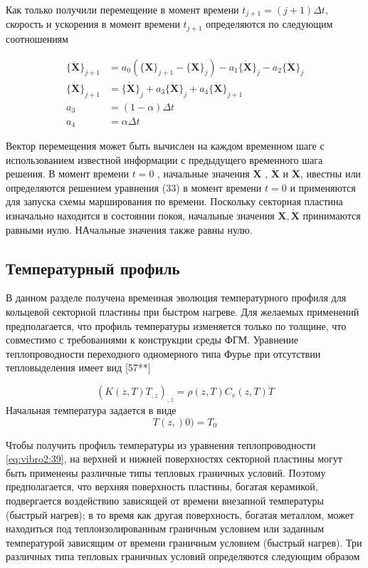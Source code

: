 Как только получили перемещение в момент времени \(t_{j+1} = (j+1)\Delta t\), скорость и ускорения в момент времени \(t_{j+1}\) определяются по следующим соотношениям

\begin{equation}
	\label{eq:vibro2:37}
	\begin{split}
	\{\boldsymbol{\ddot{X}} \}_{j+1} &= a_0 (\{\boldsymbol{X} \}_{j+1}-\{\boldsymbol{X} \}_{j}) - a_1 \{\boldsymbol{\dot{X}} \}_{j} - a_2 \{\boldsymbol{\ddot{X}} \}_{j}
	\\
	\{\boldsymbol{\ddot{X}} \}_{j+1} &= \{\boldsymbol{\dot{X}} \}_{j}+a_3\{\boldsymbol{\ddot{X}} \}_{j}+a_4 \{\boldsymbol{\ddot{X}} \}_{j+1}
	\\
	a_3 & = (1-\alpha)\Delta t
	\\
	a_4 &= \alpha \Delta t
	\end{split}
\end{equation}

Вектор перемещения может быть вычислен на каждом временном шаге с использованием известной информации с предыдущего временного шага решения. В момент времени \(t =0\) , начальные значения \(\boldsymbol{X}\) , \(\boldsymbol{\dot{X}}\) и \(\boldsymbol{\ddot{X}}\), ивестны или определяются решением уравнения (33) в момент времени \(t =0\) и применяются для запуска схемы марширования по времени. Поскольку секторная пластина изначально находится в состоянии покоя, начальные значения \(\boldsymbol{X}, \boldsymbol{\dot{X}}\) принимаются равными нулю. НАчальные значения также равны нулю.

\subsection{Температурный профиль}\label{ch:ch3/sec3/sub6}

В данном разделе получена временная эволюция температурного профиля для кольцевой секторной пластины при быстром нагреве.  Для желаемых применений предполагается, что профиль температуры изменяется только по толщине, что совместимо с требованиями к конструкции среды ФГМ. Уравнение теплопроводности переходного одномерного типа Фурье при отсутствии тепловыделения имеет вид [57**]

\begin{equation}
	\label{eq:vibro2:39}
	(K(z, T)T_{,z})_{,z} = \rho(z, T) C_v(z, T) \dot{T}
\end{equation}	
Начальная температура задается в виде \[T(z,)0) =T_0\]

Чтобы получить профиль температуры из уравнения теплопроводности \cref{eq:vibro2:39}, на верхней и нижней поверхностях секторной пластины могут быть применены различные типы тепловых граничных условий. Поэтому предполагается, что верхняя поверхность пластины, богатая керамикой, подвергается воздействию зависящей от времени внезапной температуры (быстрый нагрев); в то время как другая поверхность, богатая металлом, может находиться под теплоизолированным граничным условием или заданным температурой зависящим от времени граничным условием (быстрый нагрев). Три различных типа тепловых граничных условий определяются следующим образом


